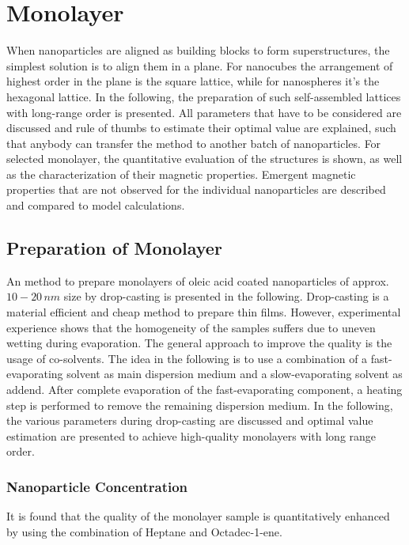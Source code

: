 \documentclass[\main/dresen_thesis.tex]{subfiles}
\begin{document}
\chapter{Monolayer}\label{ch:monolayers}
When nanoparticles are aligned as building blocks to form superstructures, the simplest solution is to align them in a plane. 
For nanocubes the arrangement of highest order in the plane is the square lattice, while for nanospheres it's the hexagonal lattice.
In the following, the preparation of such self-assembled lattices with long-range order is presented.
All parameters that have to be considered are discussed and rule of thumbs to estimate their optimal value are explained, such that anybody can transfer the method to another batch of nanoparticles.
For selected monolayer, the quantitative evaluation of the structures is shown, as well as the characterization of their magnetic properties. Emergent magnetic properties that are not observed for the individual nanoparticles are described and compared to model calculations.


\section{Preparation of Monolayer}
An method to prepare monolayers of oleic acid coated nanoparticles of approx. $10 - 20 \, \unit{nm}$ size by drop-casting is presented in the following. 
Drop-casting is a material efficient and cheap method to prepare thin films. 
However, experimental experience shows that the homogeneity of the samples suffers due to uneven wetting during evaporation. 
The general approach to improve the quality is the usage of co-solvents. 
The idea in the following is to use a combination of a fast-evaporating solvent as main dispersion medium and a slow-evaporating solvent as addend.
After complete evaporation of the fast-evaporating component, a heating step is performed to remove the remaining dispersion medium.
In the following, the various parameters during drop-casting are discussed and optimal value estimation are presented to achieve high-quality monolayers with long range order.

\subsection{Nanoparticle Concentration}

It is found that the quality of the monolayer sample is quantitatively enhanced by using the combination of Heptane and Octadec-1-ene.
\end{document}
